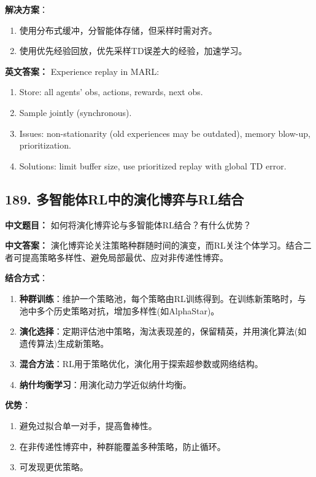 \documentclass[10pt,a4paper]{ctexart}
\begin{document}
\textbf{解决方案}：
\begin{enumerate}
    \item 使用分布式缓冲，分智能体存储，但采样时需对齐。
    \item 使用优先经验回放，优先采样TD误差大的经验，加速学习。
\end{enumerate}

\textbf{英文答案：}  
Experience replay in MARL:

\begin{enumerate}
    \item Store: all agents' obs, actions, rewards, next obs.
    \item Sample jointly (synchronous).
    \item Issues: non-stationarity (old experiences may be outdated), memory blow-up, prioritization.
    \item Solutions: limit buffer size, use prioritized replay with global TD error.
\end{enumerate}

\subsection*{189. 多智能体RL中的演化博弈与RL结合}
\textbf{中文题目：} 如何将演化博弈论与多智能体RL结合？有什么优势？

\textbf{中文答案：}  
演化博弈论关注策略种群随时间的演变，而RL关注个体学习。结合二者可提高策略多样性、避免局部最优、应对非传递性博弈。

\textbf{结合方式}：
\begin{enumerate}
    \item \textbf{种群训练}：维护一个策略池，每个策略由RL训练得到。在训练新策略时，与池中多个历史策略对抗，增加多样性(如AlphaStar)。
    \item \textbf{演化选择}：定期评估池中策略，淘汰表现差的，保留精英，并用演化算法(如遗传算法)生成新策略。
    \item \textbf{混合方法}：RL用于策略优化，演化用于探索超参数或网络结构。
    \item \textbf{纳什均衡学习}：用演化动力学近似纳什均衡。
\end{enumerate}

\textbf{优势}：
\begin{enumerate}
    \item 避免过拟合单一对手，提高鲁棒性。
    \item 在非传递性博弈中，种群能覆盖多种策略，防止循环。
    \item 可发现更优策略。
\end{enumerate}
\end{document}

